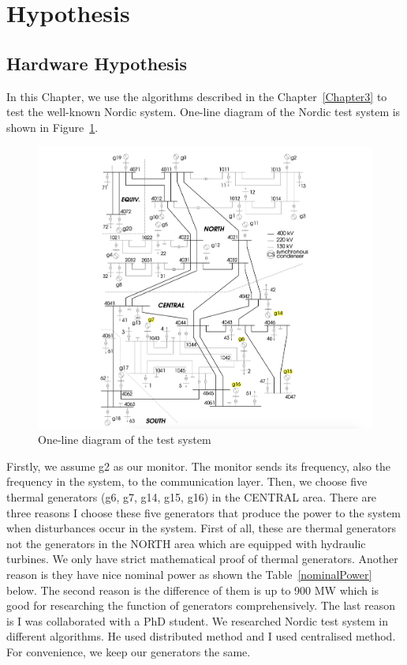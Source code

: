 \section{Hypothesis} %
\label{section4.1}
\subsection{Hardware Hypothesis} %
\label{subsection4.1.1}

In this Chapter, we use the algorithms described in the Chapter~\ref{Chapter3} to test the well-known Nordic system. One-line diagram of the Nordic test system is  shown in Figure~\ref{4_1_1_nordic}.\\

\begin{figure}[htbp]
\centering
\includegraphics[width = .891\textwidth]{figure/4_1_1_nordic.png}
\caption{One-line diagram of the test system}
\label{4_1_1_nordic}
\end{figure}

Firstly, we assume g2 as our monitor. The monitor sends its frequency, also the frequency in the system, to the communication layer. Then, we choose five thermal generators  (g6, g7, g14, g15, g16) in the CENTRAL area. There are three reasons I choose these five generators that produce the power to the system when disturbances occur in the system. First of all, these are thermal generators not the generators in the NORTH area which are equipped with hydraulic turbines. We only have strict mathematical proof of thermal generators. Another reason is they have nice nominal power as shown the Table~\ref{nominalPower} below. The second reason is the difference of them is up to 900 MW which is good for researching the function of generators comprehensively. The last reason is I was collaborated with a PhD student. We researched Nordic test system in different algorithms. He used distributed method and I used centralised method. For convenience, we keep our generators the same.\\


